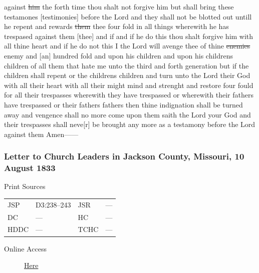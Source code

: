against \sout{him} the forth time thou shalt not forgive him but shall bring these testamones [testimonies] before the Lord and they shall not be blotted out untill he repent and rewards \sout{them} thee four fold in all things wherewith he has trespased against them [thee] and if and if he do this thou shalt forgive him with all thine heart and if he do not this I the Lord will avenge thee of thine \sout{enemies} enemy and [an] hundred fold and upon his children and upon his childrens children of all them that hate me unto the third and forth generation but if the children shall repent or the childrens children and turn unto the Lord their God with all their heart with all their might mind and strenght and restore four fould for all their trespasses wherewith they have trespassed or wherewith their fathers have trespassed or their fathers fathers then thine indignation shall be turned away and vengence shall no more come upon them saith the Lord your God and their trespasses shall neve[r] be brought any more as a testamony before the Lord against them Amen------
				
		\subsubsection{Letter to Church Leaders in Jackson County, Missouri, 10 August 1833}
			\label{EMS-1833-JS-10-AUG-1833}
		
			\begin{description}
				\item[Print Sources]
			\end{description}

				\begin{tabular}{p{0.5in}p{1in}p{0.5in}p{1in}}
				JSP	 	& D3:238--243		& JSR 		& --- \\
				DC	 	& --- 		& HC 		& --- \\
				HDDC 	& ---		& TCHC 		& --- \\
				\end{tabular}
			
			\begin{description}
				\item[Online Access] \href{https://www.josephsmithpapers.org/paper-summary/letter-to-church-leaders-in-jackson-county-missouri-10-august-1833/1}{Here}
			\end{description}
			
